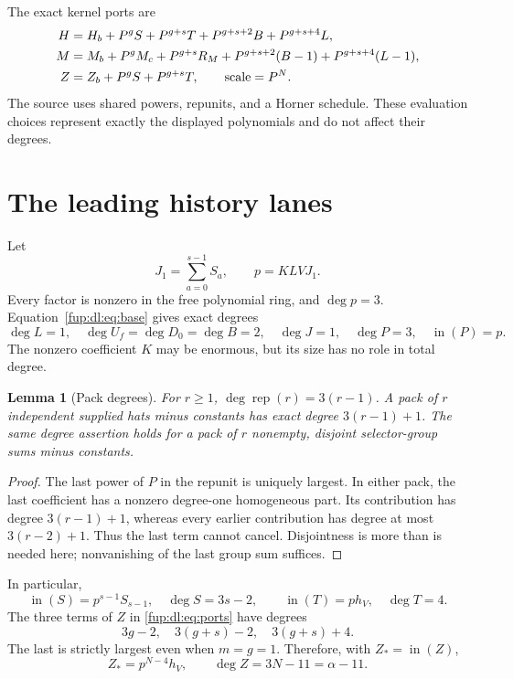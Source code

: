 \documentclass[11pt,letterpaper]{article}
\newtheorem{lemma}[theorem]{Lemma}
\theoremstyle{definition}\newtheorem{definition}[theorem]{Definition}
\theoremstyle{remark}\newtheorem{remark}[theorem]{Remark}
\newcommand{\rep}{\operatorname{rep}}
\newcommand{\topf}[1]{\operatorname{in}(#1)}
\begin{document}
The exact kernel ports are
\begin{align}
 H&=H_b+P^gS+P^{g+s}T+P^{g+s+2}B+P^{g+s+4}L,\notag\\
 M&=M_b+P^gM_c+P^{g+s}R_M+P^{g+s+2}(B-1)
       +P^{g+s+4}(L-1),\notag\\
 Z&=Z_b+P^gS+P^{g+s}T,\qquad \mathrm{scale}=P^N.\label{fup:dl:eq:ports}
\end{align}
The source uses shared powers, repunits, and a Horner schedule. These evaluation choices represent exactly the displayed polynomials and do not affect their degrees.

\section{The leading history lanes}\label{fup:dl:sec:lanes}
Let
\begin{equation}\label{fup:dl:eq:p}
 J_1=\sum_{a=0}^{s-1}S_a,\qquad p=KLVJ_1.
\end{equation}
Every factor is nonzero in the free polynomial ring, and $\deg p=3$. Equation~\eqref{fup:dl:eq:base} gives exact degrees
\[
 \deg L=1,\quad\deg U_f=\deg D_0=\deg B=2,
 \quad\deg J=1,\quad\deg P=3,\quad\topf{P}=p.
\]
The nonzero coefficient $K$ may be enormous, but its size has no role in total degree.

\begin{lemma}[Pack degrees]\label{fup:dl:lem:pack}
For $r\ge1$, $\deg\rep(r)=3(r-1)$. A pack of $r$ independent supplied hats minus constants has exact degree $3(r-1)+1$. The same degree assertion holds for a pack of $r$ nonempty, disjoint selector-group sums minus constants.
\end{lemma}
\begin{proof}
The last power of $P$ in the repunit is uniquely largest. In either pack, the last coefficient has a nonzero degree-one homogeneous part. Its contribution has degree $3(r-1)+1$, whereas every earlier contribution has degree at most $3(r-2)+1$. Thus the last term cannot cancel. Disjointness is more than is needed here; nonvanishing of the last group sum suffices.
\end{proof}

In particular,
\[
 \topf{S}=p^{s-1}S_{s-1},\quad \deg S=3s-2,
 \qquad \topf{T}=ph_V,\quad\deg T=4.
\]
The three terms of $Z$ in \eqref{fup:dl:eq:ports} have degrees
\[
 3g-2,\quad 3(g+s)-2,\quad 3(g+s)+4.
\]
The last is strictly largest even when $m=g=1$. Therefore, with $Z_*=\topf{Z}$,
\begin{equation}\label{fup:dl:eq:Ztop}
 Z_*=p^{N-4}h_V,\qquad \deg Z=3N-11=\alpha-11.
\end{equation}
\end{document}

